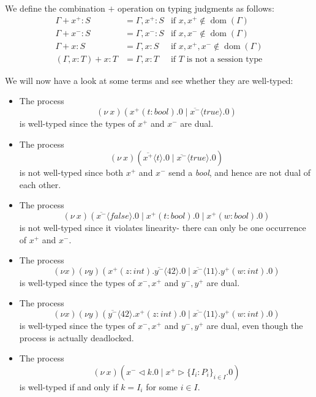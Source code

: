 \documentclass[a4paper, openany]{memoir}
\theoremstyle{definition}
\begin{document}
    We define the combination $+$ operation on typing judgments as follows:
    \begin{align*}
        \Gamma + x^+ \colon S &= \Gamma, x^+ \colon S & \textrm{if } x, x^+ \not\in \operatorname{dom}(\Gamma) \\
        \Gamma + x^- \colon S &= \Gamma, x^- \colon S & \textrm{if } x, x^- \not\in \operatorname{dom}(\Gamma) \\
        \Gamma + x \colon S &= \Gamma, x \colon S & \textrm{if } x, x^+, x^- \not\in \operatorname{dom}(\Gamma) \\
        (\Gamma, x \colon T) + x \colon T &= \Gamma, x \colon T & \textrm{if } T \textrm{ is not a session type}
    \end{align*}

    We will now have a look at some terms and see whether they are well-typed:
    \begin{itemize}
        \item The process
        \[(\nu \ x)(x^+(t \colon \textit{bool}).0 \mid \overline{x^-} \langle \textit{true} \rangle.0)\]
        is well-typed since the types of $x^+$ and $x^-$ are dual.

        \item The process
        \[(\nu \ x)(\overline{x^+} \langle t \rangle.0 \mid \overline{x^-}\langle \textit{true} \rangle.0)\]
        is not well-typed since both $x^+$ and $x^-$ send a \textit{bool}, and hence are not dual of each other.
        
        \item The process
        \[(\nu \ x)(\overline{x^-} \langle \textit{false} \rangle.0 \mid x^+ (t \colon \textit{bool}).0 \mid x^+(w \colon \textit{bool}).0)\]
        is not well-typed since it violates linearity- there can only be one occurrence of $x^+$ and $x^-$.

        \item The process
        \[(\nu x)(\nu y)(x^+(z \colon \textit{int}).\overline{y^-}\langle 42 \rangle.0 \mid \overline{x^-} \langle 11 \rangle.y^+(w \colon \textit{int}).0)\]
        is well-typed since the types of $x^-, x^+$ and $y^-, y^+$ are dual.

        \item The process
        \[(\nu x)(\nu y)(\overline{y^-}\langle 42 \rangle.x^+(z \colon \textit{int}).0 \mid \overline{x^-} \langle 11 \rangle.y^+(w \colon \textit{int}).0)\]
        is well-typed since the types of $x^-, x^+$ and $y^-, y^+$ are dual, even though the process is actually deadlocked.

        \item The process
        \[(\nu \ x)(x^- \vartriangleleft k.0 \mid x^+ \vartriangleright \{I_i \colon P_i\}_{i \in I}.0)\]
        is well-typed if and only if $k = I_i$ for some $i \in I$.
    \end{itemize}
\end{document}
